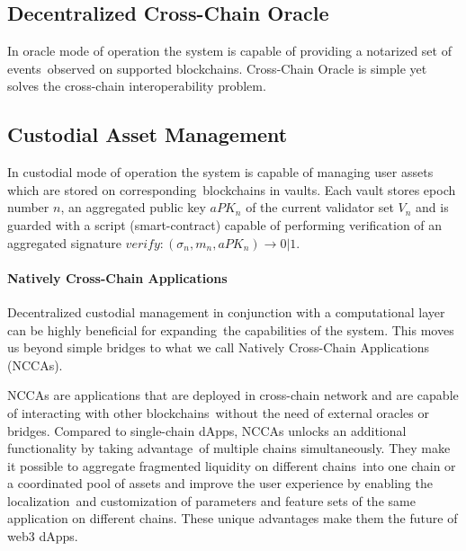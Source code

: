 \subsection{Decentralized Cross-Chain Oracle}\label{subsec:cross-chain-oracle}

In oracle mode of operation the system is capable of providing a notarized set of events\
observed on supported blockchains.
Cross-Chain Oracle is simple yet solves the cross-chain interoperability problem.

\subsection{Custodial Asset Management}\label{subsec:custodial-asset-management}

In custodial mode of operation the system is capable of managing user assets which are stored on corresponding\
blockchains in vaults.
Each vault stores epoch number $n$, an aggregated public key $aPK_n$ of the current validator set $V_n$ and
is guarded with a script (smart-contract) capable of performing verification of
an aggregated signature ${verify: (\sigma_n, m_n, aPK_n) \rightarrow 0 | 1}$.

\paragraph{Natively Cross-Chain Applications}

Decentralized custodial management in conjunction with a computational layer can be highly beneficial for expanding\
the capabilities of the system.
This moves us beyond simple bridges to what we call Natively Cross-Chain Applications (NCCAs).

NCCAs are applications that are deployed in cross-chain network and are capable of interacting with other blockchains\
without the need of external oracles or bridges.
Compared to single-chain dApps, NCCAs unlocks an additional functionality by taking advantage\
of multiple chains simultaneously.
They make it possible to aggregate fragmented liquidity on different chains\
into one chain or a coordinated pool of assets and improve the user experience by enabling the localization\
and customization of parameters and feature sets of the same application on different chains.
These unique advantages make them the future of web3 dApps.
